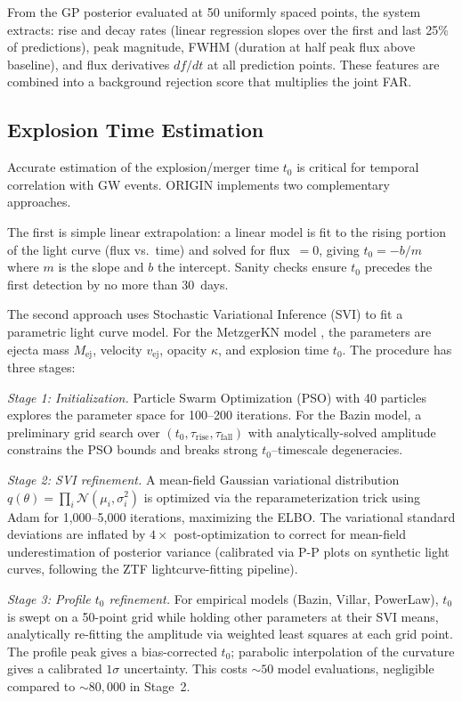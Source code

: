 \documentclass[twocolumn]{article}
\begin{document}
From the GP posterior evaluated at 50 uniformly spaced points, the system extracts: rise and decay rates (linear regression slopes over the first and last 25\% of predictions), peak magnitude, FWHM (duration at half peak flux above baseline), and flux derivatives $df/dt$ at all prediction points. These features are combined into a background rejection score that multiplies the joint FAR.

\subsection{Explosion Time Estimation} \label{sec:t0}

Accurate estimation of the explosion/merger time $t_0$ is critical for temporal correlation with GW events. ORIGIN implements two complementary approaches.

The first is simple linear extrapolation: a linear model is fit to the rising portion of the light curve (flux vs.\ time) and solved for flux~$= 0$, giving $t_0 = -b/m$ where $m$ is the slope and $b$ the intercept. Sanity checks ensure $t_0$ precedes the first detection by no more than 30~days.

The second approach uses Stochastic Variational Inference (SVI) to fit a parametric light curve model. For the MetzgerKN model \citep{Metzger2010}, the parameters are ejecta mass $M_\mathrm{ej}$, velocity $v_\mathrm{ej}$, opacity $\kappa$, and explosion time $t_0$. The procedure has three stages:

\emph{Stage 1: Initialization.} Particle Swarm Optimization (PSO) with 40 particles explores the parameter space for 100--200 iterations. For the Bazin model, a preliminary grid search over $(t_0, \tau_\mathrm{rise}, \tau_\mathrm{fall})$ with analytically-solved amplitude constrains the PSO bounds and breaks strong $t_0$--timescale degeneracies.

\emph{Stage 2: SVI refinement.} A mean-field Gaussian variational distribution $q(\theta) = \prod_i \mathcal{N}(\mu_i, \sigma_i^2)$ is optimized via the reparameterization trick \citep{Kingma2014} using Adam \citep{Kingma2015} for 1,000--5,000 iterations, maximizing the ELBO. The variational standard deviations are inflated by $4\times$ post-optimization to correct for mean-field underestimation of posterior variance (calibrated via P-P plots on synthetic light curves, following the ZTF lightcurve-fitting pipeline).

\emph{Stage 3: Profile $t_0$ refinement.} For empirical models (Bazin, Villar, PowerLaw), $t_0$ is swept on a 50-point grid while holding other parameters at their SVI means, analytically re-fitting the amplitude via weighted least squares at each grid point. The profile peak gives a bias-corrected $t_0$; parabolic interpolation of the curvature gives a calibrated $1\sigma$ uncertainty. This costs ${\sim}50$ model evaluations, negligible compared to ${\sim}80{,}000$ in Stage~2.
\end{document}
